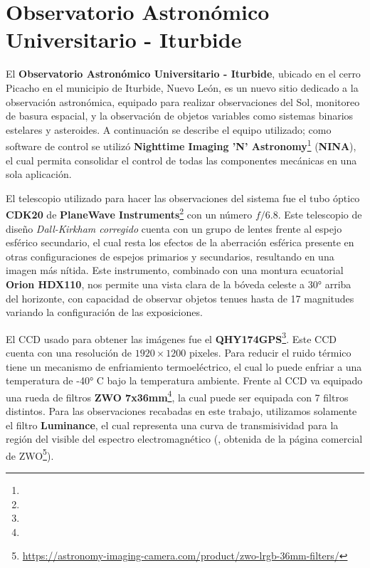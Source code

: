\section{Observatorio Astronómico Universitario - Iturbide} \label{muestra:observaciones:oau}

El \textbf{Observatorio Astronómico Universitario - Iturbide}, ubicado en el
cerro Picacho en el municipio de Iturbide, Nuevo León, es un nuevo sitio
dedicado a la observación astronómica, equipado para realizar observaciones del
Sol, monitoreo de basura espacial, y la observación de objetos variables como
sistemas binarios estelares y asteroides. A continuación se describe el equipo
utilizado; como software de control se utilizó \textbf{Nighttime Imaging 'N'
Astronomy}\footnote{} (\textbf{NINA}), el
cual permita consolidar el control de todas las componentes mecánicas en una
sola aplicación. 

El telescopio utilizado para hacer las observaciones del sistema fue el tubo
óptico \textbf{CDK20} de \textbf{PlaneWave
Instruments}\footnote{} con un
número $f/6.8$. Este telescopio de diseño \textit{Dall-Kirkham corregido} cuenta
con un grupo de lentes frente al espejo esférico secundario, el cual resta los
efectos de la aberración esférica presente en otras configuraciones de espejos
primarios y secundarios, resultando en una imagen más nítida. Este instrumento,
combinado con una montura ecuatorial \textbf{Orion HDX110}, nos permite una
vista clara de la bóveda celeste a \ang{30} arriba del horizonte, con capacidad
de observar objetos tenues hasta de 17 magnitudes variando la configuración de
las exposiciones.

El CCD usado para obtener las imágenes fue el
\textbf{QHY174GPS}\footnote{}.
Este CCD cuenta con una resolución de $1920 \times 1200$ pixeles. Para reducir
el ruido térmico tiene un mecanismo de enfriamiento termoeléctrico, el cual lo
puede enfriar a una temperatura de -\ang{40} C bajo la temperatura ambiente.
Frente al CCD va equipado una rueda de filtros \textbf{ZWO
7x36mm}\footnote{},
la cual puede ser equipada con 7 filtros distintos. Para las observaciones
recabadas en este trabajo, utilizamos solamente el filtro \textbf{Luminance}, el
cual representa una curva de transmisividad para la región del visible del
espectro electromagnético (, obtenida de
la página comercial de
ZWO\footnote{\url{https://astronomy-imaging-camera.com/product/zwo-lrgb-36mm-filters/}}). 

